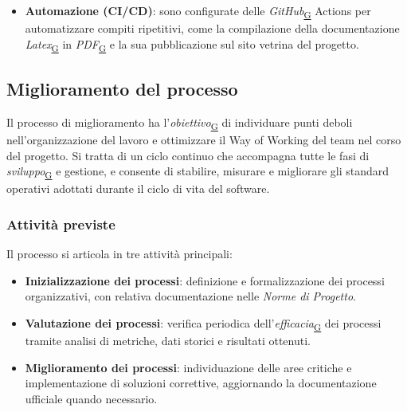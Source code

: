 \documentclass[a4paper,12pt]{article}
\begin{document}
\begin{itemize}
                \item \textbf{Automazione (CI/CD)}: sono configurate delle \textit{GitHub}\textsubscript{\href{https://atlasteam9.github.io/Atlas/glossario.html\#GitHub}{G}} Actions per automatizzare compiti ripetitivi, come la compilazione della documentazione \textit{Latex}\textsubscript{\href{https://atlasteam9.github.io/Atlas/glossario.html\#LaTeX}{G}} in \textit{PDF}\textsubscript{\href{https://atlasteam9.github.io/Atlas/glossario.html\#PDF}{G}} e la sua pubblicazione sul sito vetrina del progetto.
            \end{itemize}

    \subsection{Miglioramento del processo}
        Il processo di miglioramento ha l'\textit{obiettivo}\textsubscript{\href{https://atlasteam9.github.io/Atlas/glossario.html\#Obiettivo}{G}} di individuare punti deboli nell'organizzazione del lavoro e ottimizzare il Way of Working del team nel corso del progetto. Si tratta di un ciclo continuo che accompagna tutte le fasi di \textit{sviluppo}\textsubscript{\href{https://atlasteam9.github.io/Atlas/glossario.html\#Sviluppo}{G}} e gestione, e consente di stabilire, misurare e migliorare gli standard operativi adottati durante il ciclo di vita del software.

        \subsubsection{Attività previste}
        Il processo si articola in tre attività principali:
            \begin{itemize}
                \item \textbf{Inizializzazione dei processi}: definizione e formalizzazione dei processi organizzativi, con relativa documentazione nelle \textit{Norme di Progetto}.
                \item \textbf{Valutazione dei processi}: verifica periodica dell'\textit{efficacia}\textsubscript{\href{https://atlasteam9.github.io/Atlas/glossario.html\#Efficacia}{G}} dei processi tramite analisi di metriche, dati storici e risultati ottenuti.
                \item \textbf{Miglioramento dei processi}: individuazione delle aree critiche e implementazione di soluzioni correttive, aggiornando la documentazione ufficiale quando necessario.
            \end{itemize}
\end{document}
